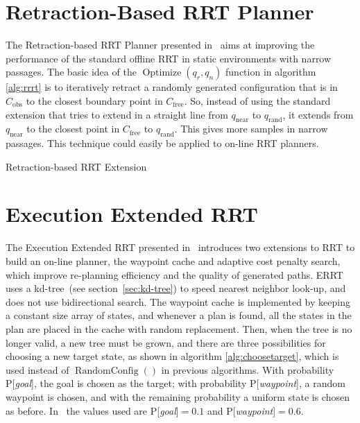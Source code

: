 \section{Retraction-Based RRT Planner}
\label{sec:RRRT}
The Retraction-based RRT Planner presented in~\cite{Zhang08} aims at
improving the performance of the standard offline RRT in static
environments with narrow passages. The basic idea of the
\(\operatorname{Optimize}(q_r,q_n)\)
function in algorithm~%
\ref{alg:rrrt} is to iteratively retract a randomly generated
configuration
that is in \(C_{\text{obs}}\) to the closest boundary point in
\(C_{\text{free}}\). So, instead of
using the standard extension that tries to extend in a straight line from
\(q_{\text{near}}\) to \(q_{\text{rand}}\), it extends from \(q_{\text{near}}\) to the closest point in
\(C_{\text{free}}\) to \(q_{\text{rand}}\). This gives more samples in narrow passages. This
technique could easily be applied to on-line RRT planners.
\begin{algorithm}[ht!]
\caption{Retraction-based RRT Extension}
\label{alg:rrrt}
\end{algorithm}

\section{Execution Extended RRT}
\label{sec:ERRT}
The Execution Extended RRT presented in~\cite{Bruce02} introduces two
extensions to RRT to build an on-line planner, the waypoint cache and adaptive
cost penalty search, which
improve re-planning efficiency and the quality of generated paths. ERRT uses
a \mbox{kd-tree}~(see section~\ref{sec:kd-tree}) to speed nearest neighbor look-up, and does not use
bidirectional search. The waypoint cache is implemented by keeping a constant
size array of states, and whenever a plan is found, all the states in the plan
are placed in the cache with random replacement. Then, when the tree is no
longer valid, a new tree must be grown, and there are three
possibilities for choosing a new target state, as shown in algorithm
\ref{alg:choosetarget}, which is used instead of
\(\operatorname{RandomConfig}()\) in previous
algorithms. With probability
P[\textit{goal}], the goal is chosen as the target; with probability
P[\textit{waypoint}], a random waypoint is chosen, and with the remaining
probability a uniform state is chosen as before. In~\cite{Bruce02} the values used
are P[\textit{goal}]$=0.1$ and P[\textit{waypoint}]$=0.6$.

